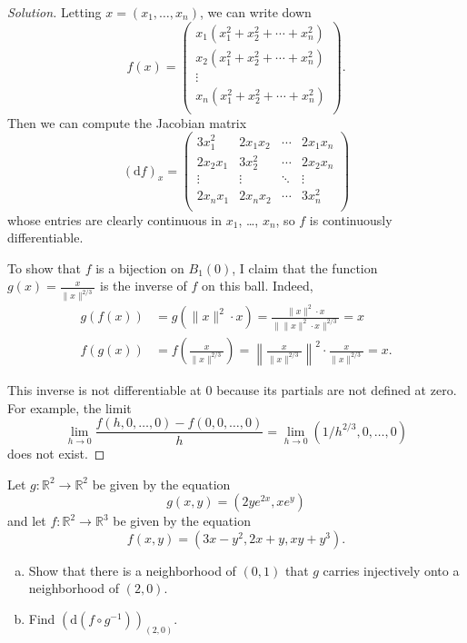 \documentclass[10pt]{scrartcl}
\providecommand{\RR}{\mathbb R}
\providecommand{\ii}{\item}
\providecommand{\inv}{^{-1}}
\newenvironment{soln}{\begin{proof}[Solution]}{\end{proof}}
\begin{document}
\begin{soln}
	Letting $x = (x_1, \dots, x_n)$, we can write down
	\[f(x) = \begin{pmatrix}
		x_1(x_1^2 + x_2^2 + \cdots + x_n^2)\\
		x_2(x_1^2 + x_2^2 + \cdots + x_n^2)\\
		\vdots\\
		x_n(x_1^2 + x_2^2 + \cdots + x_n^2)\\
	\end{pmatrix}.\]
	Then we can compute the Jacobian matrix
	\[(\mathrm df)_x = \begin{pmatrix}
		3x_1^2 & 2x_1x_2 & \cdots & 2x_1x_n\\
		2x_2x_1 & 3x_2^2 & \cdots & 2x_2x_n\\
		\vdots & \vdots & \ddots & \vdots\\
		2x_nx_1 & 2x_nx_2 & \cdots & 3x_n^2\\
	\end{pmatrix}\]
	whose entries are clearly continuous in $x_1$, \dots, $x_n$,
	so $f$ is continuously differentiable.
	
	To show that $f$ is a bijection on $B_1(0)$, I claim that
	the function $g(x) = \frac{x}{\|x\|^{2/3}}$ is the inverse of $f$
	on this ball. Indeed,
	\begin{align*}
		g(f(x)) &= g(\|x\|^2\cdot x) =
		\frac{\|x\|^2\cdot x}{\|\|x\|^2\cdot x\|^{2/3}} = x\\
		f(g(x)) &= f\left(\frac{x}{\|x\|^{2/3}}\right) =
		\left\|\frac{x}{\|x\|^{2/3}}\right\|^2\cdot \frac{x}{\|x\|^{2/3}} = x.
	\end{align*}
	
	This inverse is not differentiable at $0$ because its partials
	are not defined at zero. For example, the limit
	\[\lim_{h\to 0}\frac{f(h, 0, \dots, 0) - f(0, 0, \dots, 0)}{h}
	= \lim_{h\to 0} (1/h^{2/3}, 0, \dots, 0)\]
	does not exist.
\end{soln}

\begin{problem}
	Let $g\colon\RR^2\to\RR^2$ be given by the equation
	\[g(x,y) = (2ye^{2x}, xe^y)\]
	and let $f\colon\RR^2\to\RR^3$ be given by the equation
	\[f(x,y) = (3x-y^2, 2x+y, xy+y^3).\]
	\begin{enumerate}[(a)]
		\ii Show that there is a neighborhood of $(0,1)$ that $g$ carries
		injectively onto a neighborhood of $(2,0)$.
		\ii Find $(\mathrm d(f\circ g\inv))_{(2,0)}$.
	\end{enumerate}
\end{problem}
\end{document}

